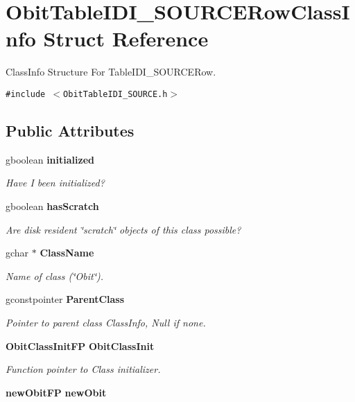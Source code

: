 \section{Obit\-Table\-IDI\_\-SOURCERow\-Class\-Info Struct Reference}
\label{structObitTableIDI__SOURCERowClassInfo}
Class\-Info Structure For Table\-IDI\_\-SOURCERow.  


{\tt \#include $<$Obit\-Table\-IDI\_\-SOURCE.h$>$}

\subsection*{Public Attributes}
\begin{CompactItemize}
\item 
gboolean {\bf initialized}
\begin{CompactList}\small\item\em Have I been initialized? \item\end{CompactList}\item 
gboolean {\bf has\-Scratch}
\begin{CompactList}\small\item\em Are disk resident \char`\"{}scratch\char`\"{} objects of this class possible? \item\end{CompactList}\item 
gchar $\ast$ {\bf Class\-Name}
\begin{CompactList}\small\item\em Name of class (\char`\"{}Obit\char`\"{}). \item\end{CompactList}\item 
gconstpointer {\bf Parent\-Class}
\begin{CompactList}\small\item\em Pointer to parent class Class\-Info, Null if none. \item\end{CompactList}\item 
{\bf Obit\-Class\-Init\-FP} {\bf Obit\-Class\-Init}
\begin{CompactList}\small\item\em Function pointer to Class initializer. \item\end{CompactList}\item 
{\bf new\-Obit\-FP} {\bf new\-Obit}

\end{CompactItemize}
